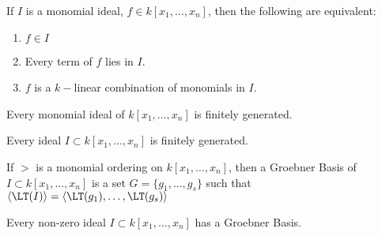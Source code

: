 \documentclass[crop=false,class=book]{standalone}
\begin{document}
\begin{theorem}
If $I$ is a monomial ideal, $f\in k[x_1,\hdots ,x_n]$, then the following are equivalent:
\begin{enumerate}
    \item $f\in I$
    \item Every term of $f$ lies in $I$.
    \item $f$ is a $k-$linear combination of monomials in $I$.
\end{enumerate}
\end{theorem}
\begin{theorem}
Every monomial ideal of $k[x_1,\hdots ,x_n]$ is finitely generated.
\end{theorem}
\begin{theorem}
Every ideal $I\subset k[x_1,\hdots ,x_n]$ is finitely generated.
\end{theorem}
\begin{definition}
If $>$ is a monomial ordering on $k[x_1,\hdots ,x_n]$, then a Groebner Basis of $I\subset k[x_1,\hdots ,x_n]$ is a set $G = \{g_1,\hdots, g_s\}$ such that $\langle \LT(I)\rangle = \langle \LT(g_1),\hdots, \LT(g_s)\rangle$
\end{definition}
\begin{theorem}
Every non-zero ideal $I\subset k[x_1,\hdots ,x_n]$ has a Groebner Basis.
\end{theorem}
\end{document}
